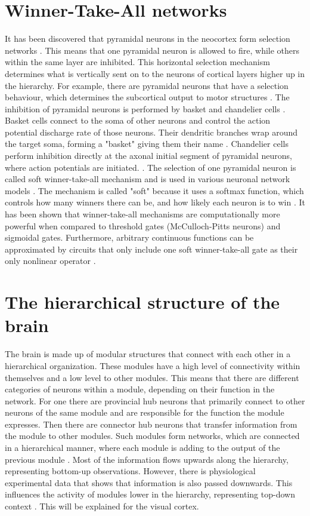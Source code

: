 \section{Winner-Take-All networks}

It has been discovered that pyramidal neurons in the neocortex form selection networks \citep{softWTA}. This means that one pyramidal neuron is allowed to fire, while others within the same layer are inhibited. This horizontal selection mechanism determines what is vertically sent on to the neurons of cortical layers higher up in the hierarchy. For example, there are pyramidal neurons that have a selection behaviour, which determines the subcortical output to motor structures \citep{softWTA}. The inhibition of pyramidal neurons is performed by basket and chandelier cells \citep{softWTA}. Basket cells connect to the soma of other neurons and control the action potential discharge rate of those neurons. Their dendritic branches wrap around the target soma, forming a "basket" giving them their name \citep{basketCells}. Chandelier cells perform inhibition directly at the axonal initial segment of pyramidal neurons, where action potentials are initiated. \citep{chandelierCells}. The selection of one pyramidal neuron is called soft winner-take-all mechanism and is used in various neuronal network models \citep{softWTA}. The mechanism is called "soft" because it uses a softmax function, which controls how many winners there can be, and how likely each neuron is to win \citep{handbookWTA}. It has been shown that winner-take-all mechanisms are computationally more powerful when compared to threshold gates (McCulloch-Pitts neurons) and sigmoidal gates. Furthermore, arbitrary continuous functions can be approximated by circuits that only include one soft winner-take-all gate as their only nonlinear operator \citep{WTAPower}.

\section{The hierarchical structure of the brain}

The brain is made up of modular structures that connect with each other in a hierarchical organization. These modules have a high level of connectivity within themselves and a low level to other modules. This means that there are different categories of neurons within a module, depending on their function in the network. For one there are provincial hub neurons that primarily connect to other neurons of the same module and are responsible for the function the module expresses. Then there are connector hub neurons that transfer information from the module to other modules. Such modules form networks, which are connected in a hierarchical manner, where each module is adding to the output of the previous module \citep{hierarchicalBrain}.
Most of the information flows upwards along the hierarchy, representing bottom-up observations. However, there is physiological experimental data that shows that information is also passed downwards. This influences the activity of modules lower in the hierarchy, representing top-down context \citep{HierachicalBayesVisualCortex}. This will be explained for the visual cortex.

